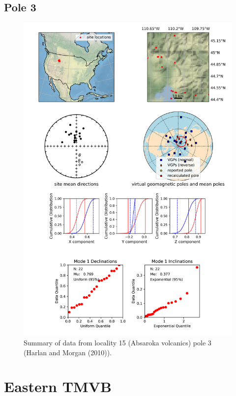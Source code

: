 \subsection{Pole 3}


\begin{figure}[H]
\centering
\includegraphics[width=5 in]{./15/3/pole_summary.png}
\caption{Summary of data from locality 15 (Absaroka volcanics) pole 3 (Harlan and Morgan (2010)).}
\end{figure}

\section{Eastern TMVB}
